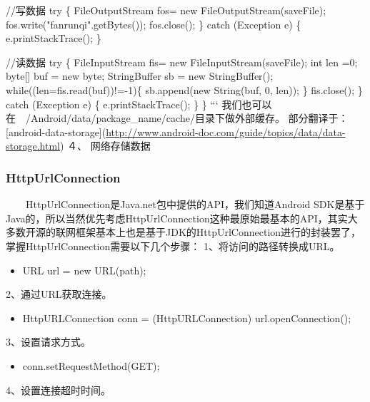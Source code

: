 \documentclass[9pt, b5paper]{article}
\begin{document}
\begin{enumerate}
//写数据
 try \{
     FileOutputStream fos= new FileOutputStream(saveFile); 
     fos.write("fanrunqi".getBytes()); 
     fos.close();
 \} catch (Exception e) \{
     e.printStackTrace();
 \} 

                //读数据
                 try \{
                    FileInputStream fis= new FileInputStream(saveFile); 
                    int len =0;
                    byte[] buf = new byte\footnotemark[1]{};
                    StringBuffer sb = new StringBuffer();
                    while((len=fis.read(buf))!=-1)\{
                        sb.append(new String(buf, 0, len));
                    \}
                    fis.close();
                \} catch (Exception e) \{
                    e.printStackTrace();
                \}  
        \}
``` 
我们也可以在　/Android/data/package\_name/cache/目录下做外部缓存。
部分翻译于：[android-data-storage](\url{http://www.android-doc.com/guide/topics/data/data-storage.html})
 ４、 网络存储数据
\end{enumerate}
\subsubsection{}
\label{sec-7-0-5}
\subsubsection{HttpUrlConnection}
\label{sec-7-0-6}
 　　HttpUrlConnection是Java.net包中提供的API，我们知道Android SDK是基于Java的，所以当然优先考虑HttpUrlConnection这种最原始最基本的API，其实大多数开源的联网框架基本上也是基于JDK的HttpUrlConnection进行的封装罢了，掌握HttpUrlConnection需要以下几个步骤：
1、将访问的路径转换成URL。
\begin{itemize}
\item URL url = new URL(path);
\end{itemize}
2、通过URL获取连接。

\begin{itemize}
\item HttpURLConnection conn = (HttpURLConnection) url.openConnection();
\end{itemize}

3、设置请求方式。

\begin{itemize}
\item conn.setRequestMethod(GET);
\end{itemize}

4、设置连接超时时间。
\end{document}
